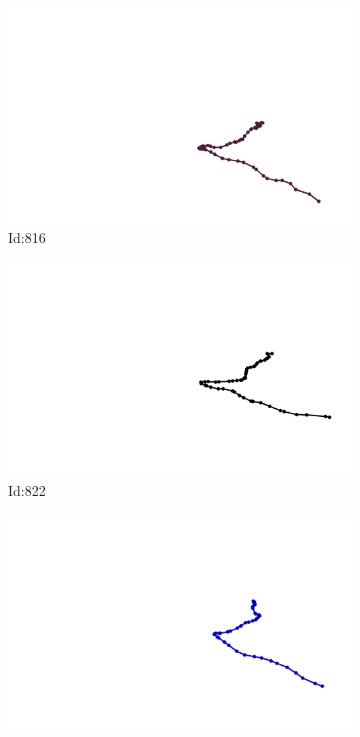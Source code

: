 \documentclass[12pt,twoside]{report}
\begin{document}
\begin{figure}
\begin{subfigure}[b]{0.20\textwidth}
\centering
\includegraphics[width=\textwidth]{../trajectories/816.png}
\caption{Id:816}
\end{subfigure}
\begin{subfigure}[b]{0.20\textwidth}
\centering
\includegraphics[width=\textwidth]{../trajectories/822.png}
\caption{Id:822}
\end{subfigure}
\begin{subfigure}[b]{0.20\textwidth}
\centering
\includegraphics[width=\textwidth]{../trajectories/861.png}

\end{subfigure}
\end{figure}
\end{document}
